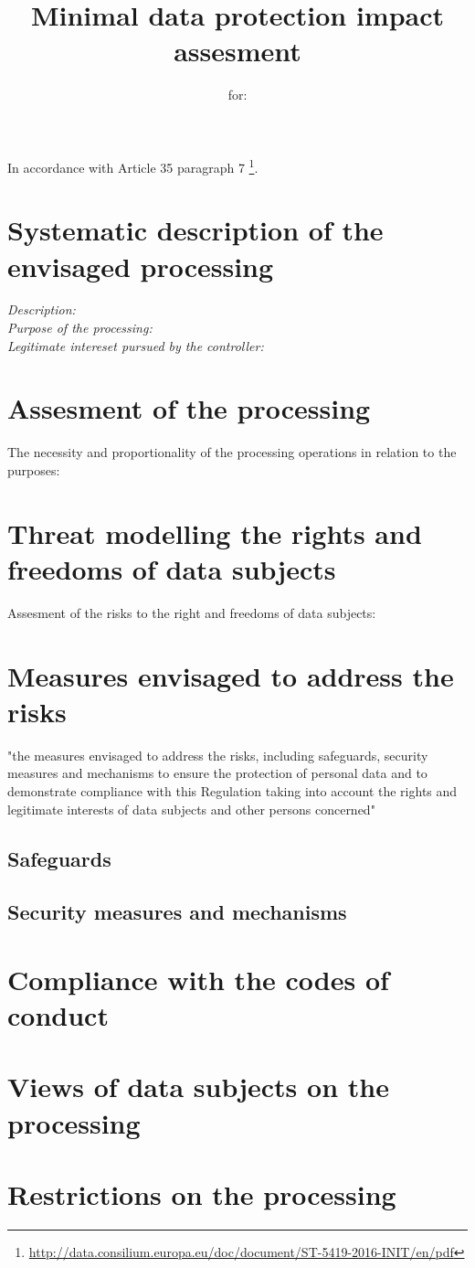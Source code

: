 \documentclass[11pt]{article}
\title{\textbf{Minimal data protection impact assesment}}
\author{for: }
\date{}
\begin{document}
\maketitle
In accordance with Article 35 paragraph 7 \footnote{\url{http://data.consilium.europa.eu/doc/document/ST-5419-2016-INIT/en/pdf}}.

\section*{Systematic description of the envisaged processing}
\textit{Description:}
\\
\textit{Purpose of the processing:}
\\
\textit{Legitimate intereset pursued by the controller:}

\section*{Assesment of the processing}
The necessity and proportionality of the processing operations in
relation to the purposes:\\

\section*{Threat modelling the rights and freedoms of data subjects}
Assesment of the risks to the right and freedoms of data subjects:\\

\section*{Measures envisaged to address the risks}
"the measures envisaged to address the risks, including safeguards, security measures and mechanisms to ensure the protection of personal data and to demonstrate compliance with this Regulation taking into account the rights and legitimate interests of data subjects and other persons concerned"

\subsection*{Safeguards}

\subsection*{Security measures and mechanisms}

\section*{Compliance with the codes of conduct}
\section*{Views of data subjects on the processing}
\section*{Restrictions on the processing}
\end{document}
